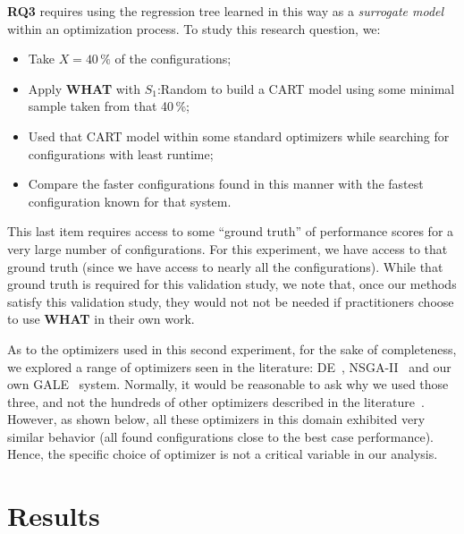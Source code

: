 \documentclass{sig-alternative}
\newcommand{\bi}{\begin{itemize}}%
\newcommand{\ei}{\end{itemize}}
\newcommand{\what}{{\bf WHAT }}
\begin{document}
{\bf RQ3} requires using the regression tree learned in this way as a {\em surrogate model} within an optimization process. To study this research question, we:
\bi
\item Take   $X=40\,\%$ of the configurations;
\item Apply \what with $S_1$:Random to build a CART model using some minimal sample taken from that 40\,\%;
\item Used that CART model within some standard optimizers while searching for 
configurations with least runtime;
\item  Compare the faster configurations found in this manner with the fastest configuration
known for that system.
\ei
This last item requires access to some ``ground truth'' of performance scores for a very
large number of configurations. For this experiment, we have access to that ground truth
(since we have access to nearly all the configurations). While that ground truth is required for this
validation study, we note that, once our methods satisfy this validation study,
they would not not be needed if practitioners choose to use \what in their own work.

As to the optimizers used in this second experiment, for the sake of completeness, we explored
a range of optimizers seen in the   literature:  DE~\cite{storn1997differential}, NSGA-II~\cite{deb00afast}
and our own GALE~\cite{krall2014gale,zuluaga2013active} system.   Normally,
it would be  reasonable to ask
why we used those three, and not the hundreds of other 
optimizers described in the literature~\cite{fletcher13,harman12}. However,
as shown below, all these optimizers in this
domain exhibited  very similar
behavior (all found configurations close to the
best case performance). Hence, the specific
choice of optimizer is not a critical
variable in  our analysis.


\section{Results}
\end{document}
